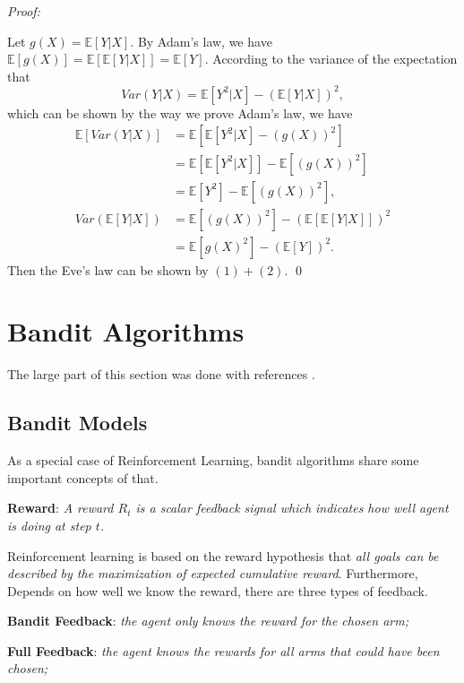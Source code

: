 \documentclass{progartcn}
\begin{document}
			\textit{Proof:}
			
			Let $g(X)=\mathbb{E}[Y|X]$. By Adam's law, we have $\mathbb{E}[g(X)]=\mathbb{E}[\mathbb{E}[Y|X]]=\mathbb{E}[Y]$. According to the variance of the expectation that
			\[Var(Y|X)=\mathbb{E}[Y^2|X]-(\mathbb{E}[Y|X])^2,\]
			which can be shown by the way we prove Adam's law, we have
			\begin{align*}
			\mathbb{E}[Var(Y|X)]&=\mathbb{E}[\mathbb{E}[Y^2|X]-(g(X))^2]\\
			&=\mathbb{E}[\mathbb{E}[Y^2|X]]-\mathbb{E}[(g(X))^2]\\
			&=\mathbb{E}[Y^2]-\mathbb{E}[(g(X))^2], \tag{1}\\
			Var(\mathbb{E}[Y|X])&=\mathbb{E}[(g(X))^2]-(\mathbb{E}[\mathbb{E}[Y|X]])^2\\
			&=\mathbb{E}[g(X)^2]-(\mathbb{E}[Y])^2. \tag{2}
			\end{align*}
			Then the Eve's law can be shown by $(1)+(2)$.
			\qed\\

\pagebreak

\section{Bandit Algorithms}

	The large part of this section was done with references \cite{si252,sutton2018reinforcement,slivkins2019introduction,lattimore2018bandit,liblog}.\\

	\subsection{Bandit Models}

			As a special case of Reinforcement Learning, bandit algorithms share some important concepts of that.

			\textbf{Reward}: \textit{A reward $R_t$ is a scalar feedback signal which indicates how well agent is doing at step $t$.}

			Reinforcement learning is based on the reward hypothesis that \textit{all goals can be described by the maximization of expected cumulative reward}. Furthermore, Depends on how well we know the reward, there are three types of feedback.

			\textbf{Bandit Feedback}: \textit{the agent only knows the reward for the chosen arm;}

			\textbf{Full Feedback}: \textit{the agent knows the rewards for all arms that could have been chosen;}
\end{document}
